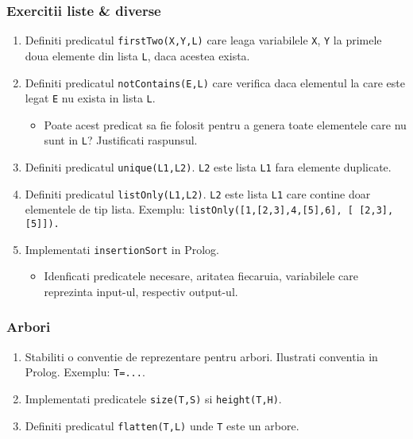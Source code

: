 \subsubsection*{ Exercitii liste \& diverse }
\begin{enumerate}
	\item  Definiti predicatul \texttt{firstTwo(X,Y,L)} care leaga variabilele \texttt{X}, \texttt{Y} la primele doua elemente din lista \texttt{L}, daca acestea exista.
	\item  Definiti predicatul \texttt{notContains(E,L)} care verifica daca elementul la care este legat \texttt{E} nu exista in lista \texttt{L}.

   \begin{itemize}
   	\item  Poate acest predicat sa fie folosit pentru a genera toate elementele care nu sunt in \texttt{L}? Justificati raspunsul.
   \end{itemize}
	\item  Definiti predicatul \texttt{unique(L1,L2)}. \texttt{L2} este lista \texttt{L1} fara elemente duplicate.
	\item  Definiti predicatul \texttt{listOnly(L1,L2)}. \texttt{L2} este lista \texttt{L1} care contine doar elementele de tip lista. Exemplu: \texttt{listOnly([1,[2,3],4,[5],6], [ [2,3],[5]]).}
	\item  Implementati \texttt{insertionSort} in Prolog.

    \begin{itemize}
    	\item  Idenficati predicatele necesare, aritatea fiecaruia, variabilele care reprezinta input-ul, respectiv output-ul.
    \end{itemize}
\end{enumerate}

\subsubsection*{ Arbori }
\begin{enumerate}
	\item  Stabiliti o conventie de reprezentare pentru arbori. Ilustrati conventia in Prolog. Exemplu: \texttt{T=...}.
	\item  Implementati predicatele \texttt{size(T,S)} si \texttt{height(T,H)}.
	\item  Definiti predicatul \texttt{flatten(T,L)} unde \texttt{T} este un arbore.
\end{enumerate}

